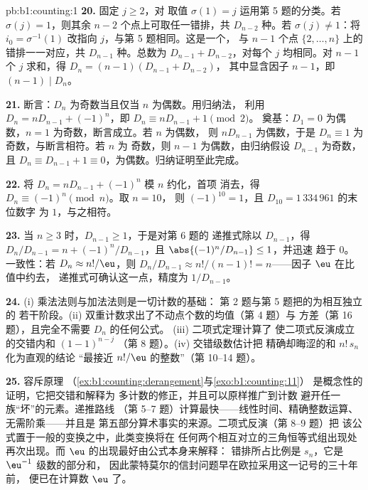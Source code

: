 \begin{solution}{pb:b1:counting:1}
\textbf{20.} 固定 $j \geq 2$，对
取值 $\sigma(1) = j$ 运用第 5 题的分类。若 $\sigma(j) = 1$，则其余
$n - 2$ 个点上可取任一错排，共 $D_{n-2}$ 种。若
$\sigma(j) \neq 1$：将 $i_0 = \sigma^{-1}(1)$ 改指向
$j$，与第 5 题相同。这是一个，
与 $n - 1$ 个点 $\{2, \dots, n\}$ 上的错排一一对应，共 $D_{n-1}$
种。总数为 $D_{n-1} + D_{n-2}$，对每个 $j$ 均相同。对
$n - 1$ 个 $j$ 求和，得 $D_n = (n-1)(D_{n-1} + D_{n-2})$，
其中显含因子 $n - 1$，即 $(n-1) \mid D_n$。

\textbf{21.} 断言：$D_n$ 为奇数当且仅当 $n$ 为偶数。用归纳法，
利用 $D_n = nD_{n-1} + (-1)^n$，即 $D_n \equiv nD_{n-1} + 1 \pmod 2$。
奠基：$D_1 = 0$ 为偶数，$n = 1$ 为奇数，断言成立。若 $n$ 为偶数，
则 $nD_{n-1}$ 为偶数，于是 $D_n \equiv 1$ 为奇数，与断言相符。若 $n$ 为
奇数，则 $n - 1$ 为偶数，由归纳假设 $D_{n-1}$ 为奇数，且
$D_n \equiv D_{n-1} + 1 \equiv 0$，为偶数。归纳证明至此完成。

\textbf{22.} 将 $D_n = nD_{n-1} + (-1)^n$ 模 $n$ 约化，首项
消去，得 $D_n \equiv (-1)^n \pmod n$。取 $n = 10$，
则 $(-1)^{10} = 1$，且 $D_{10} = 1\,334\,961$ 的末位数字
为 $1$，与之相符。

\textbf{23.} 当 $n \geq 3$ 时，$D_{n-1} \geq 1$，于是对第 6 题的
递推式除以 $D_{n-1}$，得 $D_n/D_{n-1} = n +
(-1)^n/D_{n-1}$，且 $\abs{(-1)^n/D_{n-1}} \leq 1$，并迅速
趋于 $0$。一致性：若 $D_n \approx n!/\eu$，则
$D_n/D_{n-1} \approx n!/(n-1)! = n$——因子 $\eu$ 在比值中约去，
递推式可确认这一点，精度为
$1/D_{n-1}$。

\textbf{24.} (i) 乘法法则与加法法则是一切计数的基础：
第 2 题与第 5 题把的为相互独立的
若干阶段。(ii) 双重计数求出了不动点个数的均值（第 4 题）与
方差（第 16 题），且完全不需要 $D_n$ 的任何公式。
(iii) 二项式定理计算了
使二项式反演成立的交错内和 $(1-1)^{n-j}$
（第 8 题）。(iv) 交错级数估计把
精确却晦涩的和 $n!\,s_n$ 化为直观的结论
“最接近 $n!/\eu$ 的整数”（第 10--14 题）。

\textbf{25.} 容斥原理
（\cref{ex:b1:counting:derangement}与\cref{exo:b1:counting:11}）
是概念性的证明，它把交错和解释为
多计数的修正，并且可以原样推广到计数
避开任一族“坏”的元素。递推路线
（第 5--7 题）计算最快——线性时间、精确整数运算、
无需阶乘——并且是
第五部分算术事实的来源。二项式反演（第 8--9 题）把
该公式置于一般的变换之中，此类变换将在
任何两个相互对立的三角恒等式组出现处再次出现。而
$\eu$ 的出现最好由公式本身来解释：
错排所占比例是 $s_n$，它是 $\eu^{-1}$ 级数的部分和，
因此蒙特莫尔的信封问题早在欧拉采用这一记号的三十年前，
便已在计算数 $\eu$ 了。
\end{solution}
